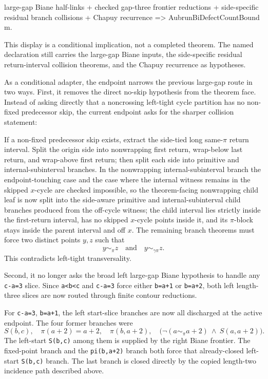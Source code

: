 \documentclass[
]{article}
\newenvironment{Shaded}{}{}
\newcommand{\NormalTok}[1]{#1}
\begin{document}
\begin{Shaded}
\begin{Highlighting}[]
\NormalTok{large{-}gap Biane half{-}links}
\NormalTok{+ checked gap{-}three frontier reductions}
\NormalTok{+ side{-}specific residual branch collisions}
\NormalTok{+ Chapuy recurrence}
\NormalTok{=\textgreater{} AubrunBiDefectCountBound m.}
\end{Highlighting}
\end{Shaded}

This display is a conditional implication, not a completed theorem. The
named declaration still carries the large-gap Biane inputs, the
side-specific residual return-interval collision theorems, and the
Chapuy recurrence as hypotheses.

As a conditional adapter, the endpoint narrows the previous large-gap
route in two ways. First, it removes the direct no-skip hypothesis from
the theorem face. Instead of asking directly that a noncrossing
left-tight cycle partition has no non-fixed predecessor skip, the
current endpoint asks for the sharper collision statement:

If a non-fixed predecessor skip exists, extract the side-tied long
same-\(\pi\) return interval. Split the origin side into nonwrapping
first return, wrap-below last return, and wrap-above first return; then
split each side into primitive and internal-subinterval branches. In the
nonwrapping internal-subinterval branch the endpoint-touching case and
the case where the internal witness remains in the skipped \(x\)-cycle
are checked impossible, so the theorem-facing nonwrapping child leaf is
now split into the side-aware primitive and internal-subinterval child
branches produced from the off-cycle witness; the child interval lies
strictly inside the first-return interval, has no skipped \(x\)-cycle
points inside it, and its \(\pi\)-block stays inside the parent interval
and off \(x\). The remaining branch theorems must force two distinct
points \(y,z\) such that \[
  y \sim_\pi z
  \quad\text{and}\quad
  y \sim_{\gamma\pi} z.
\] This contradicts left-tight transversality.

Second, it no longer asks the broad left large-gap Biane hypothesis to
handle any \texttt{c-a=3} slice. Since
\texttt{a\textless{}b\textless{}c} and \texttt{c-a=3} force either
\texttt{b=a+1} or \texttt{b=a+2}, both left length-three slices are now
routed through finite contour reductions.

For \texttt{c-a=3}, \texttt{b=a+1}, the left start-slice branches are
now all discharged at the active endpoint. The four former branches were
\[
  S(b,c),\quad \pi(a+2)=a+2,\quad \pi(b,a+2),
  \quad
  \bigl(\neg(a\sim_\pi a+2)\ \wedge\ S(a,a+2)\bigr).
\] The left-start \texttt{S(b,c)} among them is supplied by the right
Biane frontier. The fixed-point branch and the \texttt{pi(b,a+2)} branch
both force that already-closed left-start \texttt{S(b,c)} branch. The
last branch is closed directly by the copied length-two incidence path
described above.
\end{document}
